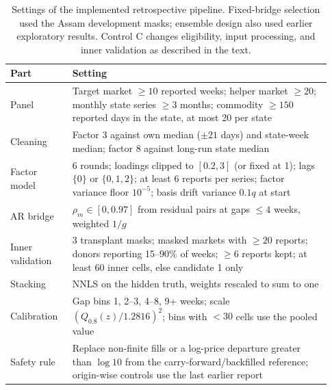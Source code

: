 \begin{table}[t]
\caption{Settings of the implemented retrospective pipeline. Fixed-bridge selection used the Assam development masks; ensemble design also used earlier exploratory results. Control C changes eligibility, input processing, and inner validation as described in the text.}
\label{tab:settings}
\small
\begin{tabular}{p{0.18\linewidth}p{0.75\linewidth}}
\toprule
Part & Setting \\
\midrule
Panel & Target market $\ge10$ reported weeks; helper market $\ge20$; monthly state series $\ge3$ months; commodity $\ge150$ reported days in the state, at most 20 per state \\
Cleaning & Factor 3 against own median ($\pm21$ days) and state-week median; factor 8 against long-run state median \\
Factor model & 6 rounds; loadings clipped to $[0.2,3]$ (or fixed at 1); lags $\{0\}$ or $\{0,1,2\}$; at least 6 reports per series; factor variance floor $10^{-5}$; basis drift variance $0.1q$ at start \\
AR bridge & $\rho_m\in[0,0.97]$ from residual pairs at gaps $\le4$ weeks, weighted $1/g$ \\
Inner validation & 3 transplant masks; masked markets with $\ge20$ reports; donors reporting 15--90\% of weeks; $\ge6$ reports kept; at least 60 inner cells, else candidate 1 only \\
Stacking & NNLS on the hidden truth, weights rescaled to sum to one \\
Calibration & Gap bins 1, 2--3, 4--8, 9+ weeks; scale $(Q_{0.8}(z)/1.2816)^2$; bins with $<30$ cells use the pooled value \\
Safety rule & Replace non-finite fills or a log-price departure greater than $\log 10$ from the carry-forward/backfilled reference; origin-wise controls use the last earlier report \\
\bottomrule
\end{tabular}
\end{table}
